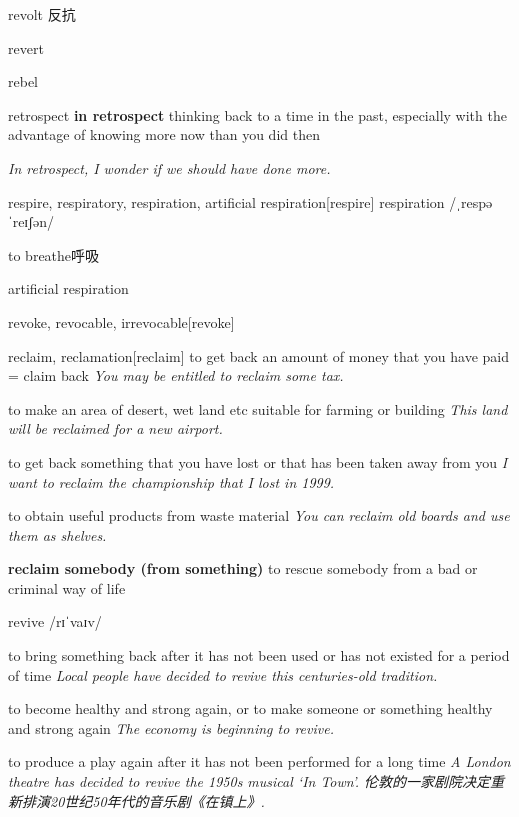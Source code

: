 \begin{DefWord}{revolt}
    反抗
\end{DefWord}

\begin{DefWord}{revert}
\end{DefWord}

\begin{DefWord}{rebel}
\end{DefWord}

\begin{DefWord}{retrospect}
    \textbf{in retrospect} thinking back to a time in the past, especially with the advantage of knowing more now than you did then

    \textit{In retrospect, I wonder if we should have done more.}
\end{DefWord}

\begin{DefWord}{respire, respiratory, respiration, artificial respiration}[respire]
    respiration /ˌrespəˈreɪʃən/ 

    to breathe呼吸

    artificial respiration
\end{DefWord}

\begin{DefWord}{revoke, revocable, irrevocable}[revoke]
\end{DefWord}

\begin{DefWord}{reclaim, reclamation}[reclaim]
    to get back an amount of money that you have paid = claim back
    \textit{You may be entitled to reclaim some tax.}

    to make an area of desert, wet land etc suitable for farming or building
    \textit{This land will be reclaimed for a new airport.}

    to get back something that you have lost or that has been taken away from you
    \textit{I want to reclaim the championship that I lost in 1999.}

    to obtain useful products from waste material
    \textit{You can reclaim old boards and use them as shelves.}

    \textbf{reclaim somebody (from something)} to rescue somebody from a bad or criminal way of life
\end{DefWord}

\begin{DefWord}{revive}
    /rɪˈvaɪv/

    to bring something back after it has not been used or has not existed for a period of time
    \textit{Local people have decided to revive this centuries-old tradition.}

    to become healthy and strong again, or to make someone or something healthy and strong again
    \textit{The economy is beginning to revive.}

    to produce a play again after it has not been performed for a long time
    \textit{A London theatre has decided to revive the 1950s musical ‘In Town'. 伦敦的一家剧院决定重新排演20世纪50年代的音乐剧《在镇上》. }
\end{DefWord}